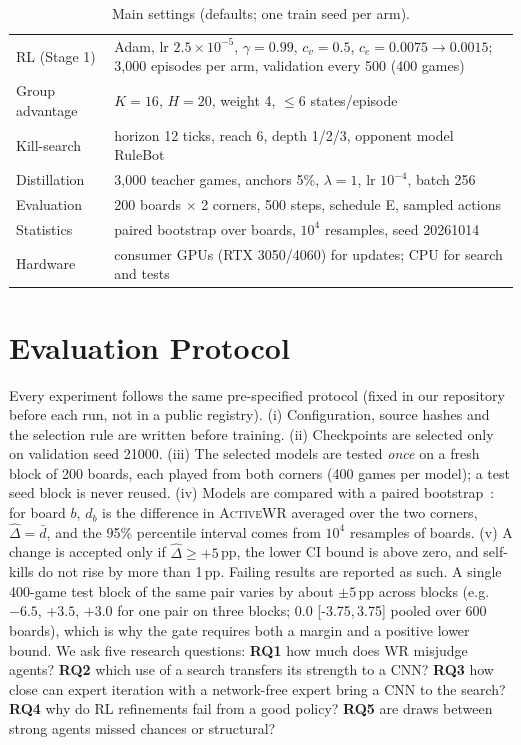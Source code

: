 \documentclass[conference]{IEEEtran}
\newcommand{\awr}{\textsc{ActiveWR}}
\newcommand{\pp}{\,pp}
\newcommand{\ci}[2]{[#1,\,#2]}
\begin{document}
\begin{table}[t]
\centering
\caption{Main settings (defaults; one train seed per arm).}
\label{tab:hyper}
\footnotesize
\setlength{\tabcolsep}{3pt}
\begin{tabular}{@{}L{0.24\columnwidth}L{0.72\columnwidth}@{}}
\toprule
RL (Stage 1) & Adam, lr $2.5\times10^{-5}$, $\gamma=0.99$, $c_v=0.5$, $c_e=0.0075\rightarrow0.0015$; 3{,}000 episodes per arm, validation every 500 (400 games) \\
Group advantage & $K=16$, $H=20$, weight 4, $\le$6 states/episode \\
Kill-search & horizon 12 ticks, reach 6, depth 1/2/3, opponent model RuleBot \\
Distillation & 3{,}000 teacher games, anchors 5\%, $\lambda=1$, lr $10^{-4}$, batch 256 \\
Evaluation & 200 boards $\times$ 2 corners, 500 steps, schedule E, sampled actions \\
Statistics & paired bootstrap over boards, $10^4$ resamples, seed 20261014 \\
Hardware & consumer GPUs (RTX 3050/4060) for updates; CPU for search and tests \\
\bottomrule
\end{tabular}
\end{table}

\section{Evaluation Protocol}
\label{sec:protocol}

Every experiment follows the same pre-specified protocol (fixed in our repository before each run, not in a public registry). (i) Configuration, source hashes and the selection rule are written before training. (ii) Checkpoints are selected only on validation seed 21000. (iii) The selected models are tested \emph{once} on a fresh block of 200 boards, each played from both corners (400 games per model); a test seed block is never reused. (iv) Models are compared with a paired bootstrap~\cite{efron1979bootstrap}: for board $b$, $d_b$ is the difference in \awr{} averaged over the two corners, $\hat\Delta=\bar d$, and the 95\% percentile interval comes from $10^4$ resamples of boards. (v) A change is accepted only if $\hat\Delta\ge+5$\pp{}, the lower CI bound is above zero, and self-kills do not rise by more than 1\pp{}. Failing results are reported as such. A single 400-game test block of the same pair varies by about $\pm5$\pp{} across blocks (e.g.\ $-6.5$, $+3.5$, $+3.0$ for one pair on three blocks; $0.0$ \ci{-3.75}{3.75} pooled over 600 boards), which is why the gate requires both a margin and a positive lower bound. We ask five research questions:
\textbf{RQ1} how much does WR misjudge agents? \textbf{RQ2} which use of a search transfers its strength to a CNN? \textbf{RQ3} how close can expert iteration with a network-free expert bring a CNN to the search? \textbf{RQ4} why do RL refinements fail from a good policy? \textbf{RQ5} are draws between strong agents missed chances or structural?
\end{document}
